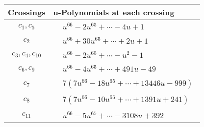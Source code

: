 \documentclass[1p]{elsarticle_modified}
\theoremstyle{definition}
\begin{document}
\begin{tabular}{m{50pt}|m{274pt}}
Crossings & \hspace{64pt}u-Polynomials at each crossing \\
\hline $$\begin{aligned}c_{1},c_{5}\end{aligned}$$&$\begin{aligned}
&u^{66}-2 u^{65}+\cdots-4 u+1
\end{aligned}$\\
\hline $$\begin{aligned}c_{2}\end{aligned}$$&$\begin{aligned}
&u^{66}+30 u^{65}+\cdots+2 u+1
\end{aligned}$\\
\hline $$\begin{aligned}c_{3},c_{4},c_{10}\end{aligned}$$&$\begin{aligned}
&u^{66}-2 u^{65}+\cdots- u^2-1
\end{aligned}$\\
\hline $$\begin{aligned}c_{6},c_{9}\end{aligned}$$&$\begin{aligned}
&u^{66}-4 u^{65}+\cdots+491 u-49
\end{aligned}$\\
\hline $$\begin{aligned}c_{7}\end{aligned}$$&$\begin{aligned}
&7(7 u^{66}-18 u^{65}+\cdots+13446 u-999)
\end{aligned}$\\
\hline $$\begin{aligned}c_{8}\end{aligned}$$&$\begin{aligned}
&7(7 u^{66}-10 u^{65}+\cdots+1391 u+241)
\end{aligned}$\\
\hline $$\begin{aligned}c_{11}\end{aligned}$$&$\begin{aligned}
&u^{66}-5 u^{65}+\cdots-3108 u+392
\end{aligned}$\\
\hline
\end{tabular}\\~\\
\newpage\renewcommand{\arraystretch}{1}
\end{document}
